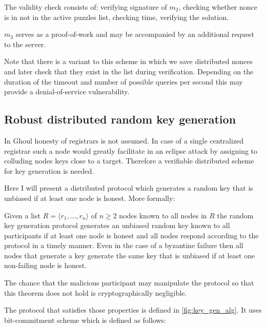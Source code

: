 The validity check consists of: verifying signature of $m_2$, checking whether
nonce is in not in the active puzzles list, checking time, verifying the
solution.

$m_3$ serves as a proof-of-work and may be accompanied by an additional request
to the server.

Note that there is a variant to this scheme in which we save distributed nonces
and later check that they exist in the list during verification. Depending on
the duration of the timeout and number of possible queries per second this may
provide a denial-of-service vulnerability.

\subsection{Robust distributed random key generation}

In Ghoul honesty of registrars is not assumed. In case of a single centralized
registrar such a node would greatly facilitate in an eclipse attack by
assigning to colluding nodes keys close to a target. Therefore a verifiable
distributed scheme for key generation is needed.

Here  I will present a distributed protocol which generates a random key that is
unbiased if at least one node is honest. More formally:

\begin{theorem*}
  Given a list $R = \langle r_1, \ldots, r_n \rangle$ of $n \geq 2$ nodes known
  to all nodes in $R$ the random key generation protocol generates an unbiased
  random key known to all participants if at least one node is honest and all
  nodes respond according to the protocol in a timely manner. Even in the case
  of a byzantine failure then all nodes that generate a key generate the same
  key that is unbiased if at least one non-failing node is honest.

  The chance that the malicious participant may manipulate the protocol so that
  this theorem does not hold is cryptographically negligible.
\end{theorem*}

The protocol that satisfies those properties is defined in
\ref{fig:key_gen_alg}.  It uses bit-commitment scheme which is defined as
follows:

